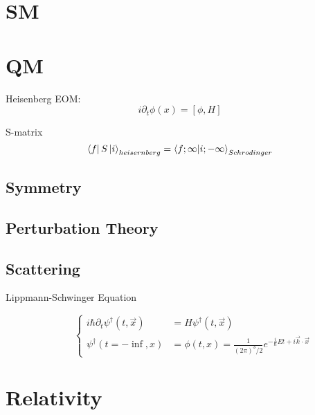 \section{SM}

\section{QM}
Heisenberg EOM:
\begin{equation}
    \label{eqn:Heisenberg EOM}
    i\partial_t\phi(x) = [\phi, H]
\end{equation}

S-matrix
\begin{equation}
    \label{S-matrix}
    \bra{f}S\ket{i}_{heisernberg} = \bra{f;\infty}\ket{i;-\infty}_{Schrodinger}
\end{equation}

\subsection{Symmetry}

\subsection{Perturbation Theory}

\subsection{Scattering}
\begin{description}
    \item [Lippmann-Schwinger Equation]
	\begin{equation}
	    \label{eqn:qm:LSEqn}
	    \left\{
		\begin{aligned}
		    i\hbar\partial_t\psi^\dag(t,\vec{x}) &= H\psi^\dag(t, \vec{x})   \\
		    \psi^\dag(t=-\inf, x) &= \phi(t,x) = \frac{1}{(2\pi)^3/2}e^{-\frac{i}{\hbar}Et + i\vec{k}\cdot\vec{x}} 
		\end{aligned}
		\right.
	\end{equation}
\end{description}

\section{Relativity}

